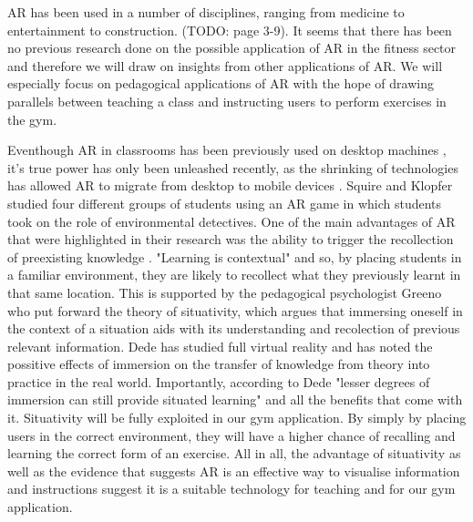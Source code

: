 \documentclass{l4proj}
\begin{document}
AR has been used in a number of disciplines, ranging from medicine to entertainment to construction.\cite{azuma_recent_2001} (TODO: page 3-9). It seems that there has been no previous research done on the possible application of AR in the fitness sector and therefore we will draw on insights from other applications of AR. We will especially focus on pedagogical applications of AR with the hope of drawing parallels between teaching a class and instructing users to perform exercises in the gym. 

Eventhough AR in classrooms has been previously used on desktop machines \cite{iordache_comparison_2009}, it's true power has only been unleashed recently, as the shrinking of technologies has allowed AR to migrate from desktop to mobile devices \cite{squire_augmented_2007}. Squire and Klopfer studied four different groups of students using an AR game in which students took on the role of environmental detectives. One of the main advantages of AR that were highlighted in their research was the ability to trigger the recollection of preexisting knowledge \cite{squire_augmented_2007}. "Learning is contextual" \cite{liestol_learning_2011} and so, by placing students in a familiar environment, they are likely to recollect what they previously learnt in that same location. This is supported by the pedagogical psychologist Greeno who put forward the theory of situativity, which argues that immersing oneself in the context of a situation aids with its understanding and recolection of previous relevant information\cite{greeno_situativity_1998}. Dede has studied full virtual reality and has noted the possitive effects of immersion on the transfer of knowledge from theory into practice in the real world\cite{dede_immersive_2009}. Importantly, according to Dede "lesser degrees of immersion can still provide situated learning" and all the benefits that come with it\cite{dede_immersive_2009}. Situativity will be fully exploited in our gym application. By simply by placing users in the correct environment, they will have a higher chance of recalling and learning the correct form of an exercise. All in all, the advantage of situativity as well as the evidence that suggests AR is an effective way to visualise information and instructions \cite{squire_augmented_2007} suggest it is a suitable technology for teaching and for our gym application.
\end{document}
